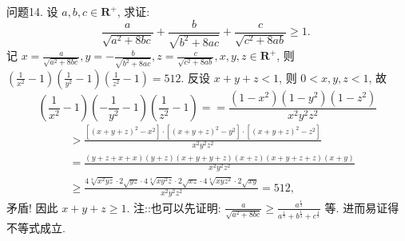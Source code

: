 问题14. 设 $a, b, c \in \mathbf{R}^{+}$, 求证:
$$
\frac{a}{\sqrt{a^2+8 b c}}+\frac{b}{\sqrt{b^2+8 a c}}+\frac{c}{\sqrt{c^2+8 a b}} \geqslant 1 \text {. }
$$
记 $x=\frac{a}{\sqrt{a^2+8 b c}}, y=-\frac{b}{\sqrt{b^2+8 a c}}, z=\frac{c}{\sqrt{c^2+8 a b}}, x, y, z \in \mathbf{R}^{+}$, 则 $\left(\frac{1}{x^2}-1\right)\left(\frac{1}{y^2}-1\right)\left(\frac{1}{z^2}-1\right)=512$.
反设 $x+y+z<1$, 则 $0<x, y, z<1$, 故
$$
\left(\frac{1}{x^2}-1\right)\left(-\frac{1}{y^2}-1\right)\left(\frac{1}{z^2}-1\right)==\frac{\left(1-x^2\right)\left(1-y^2\right)\left(1-z^2\right)}{x^2 y^2 z^2}
$$
$$
\begin{aligned}
& >\frac{\left[(x+y+z)^2-x^2\right] \cdot\left[(x+y+z)^2-y^2\right] \cdot\left[(x+y+z)^2-z^2\right]}{x^2 y^2 z^2} \\
& =\frac{(y+z+x+x)(y+z)(x+y+y+z)(x+z)(x+y+z+z)(x+y)}{x^2 y^2 z^2} \\
& \geqslant \frac{4 \sqrt[4]{x^2 y z} \cdot 2 \sqrt{y z} \cdot 4 \sqrt[4]{x y^2 z} \cdot 2 \sqrt{x z} \cdot 4 \sqrt[4]{x y z^2} \cdot 2 \sqrt{x y}}{x^2 y^2 z^2}=512,
\end{aligned}
$$
矛盾!
因此 $x+y+z \geqslant 1$.
注::也可以先证明: $\frac{a}{\sqrt{a^2+8 b c}} \geqslant \frac{a^{\frac{1}{3}}}{a^{\frac{1}{3}}+b^{\frac{1}{3}}+c^{\frac{4}{3}}}$ 等.
进而易证得不等式成立.


